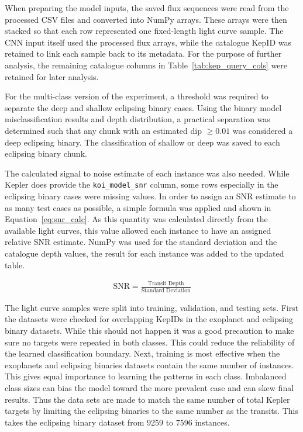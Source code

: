 When preparing the model inputs, the saved flux sequences were read from the processed CSV files and converted into NumPy arrays. These arrays were then stacked so that each row represented one fixed-length light curve sample. The CNN input itself used the processed flux arrays, while the catalogue KepID was retained to link each sample back to its metadata. For the purpose of further analysis, the remaining catalogue columns in Table~\ref{tab:kep_query_cols} were retained for later analysis. 

For the multi-class version of the experiment, a threshold was required to separate the deep and shallow eclipsing binary cases. Using the binary model misclassification results and depth distribution, a practical separation was determined such that any chunk with an estimated dip $\geq 0.01$ was considered a deep eclipsing binary. The classification of shallow or deep was saved to each eclipsing binary chunk.

The calculated signal to noise estimate of each instance was also needed. While Kepler does provide the \texttt{koi\_model\_snr} column, some rows especially in the eclipsing binary cases were missing values. In order to assign an SNR estimate to as many test cases as possible, a simple formula was applied and shown in Equation~\ref{eq:snr_calc}. As this quantity was calculated directly from the available light curves, this value allowed each instance to have an assigned relative SNR estimate. NumPy was used for the standard deviation and the catalogue depth values, the result for each instance was added to the updated table. 

\begin{align}
    \text{SNR} = \frac{\text{Transit Depth}}{\text{Standard Deviation}} \label{eq:snr_calc}
\end{align}

The light curve samples were split into training, validation, and testing sets. First the datasets were checked for overlapping KepIDs in the exoplanet and eclipsing binary datasets. While this should not happen it was a good precaution to make sure no targets were repeated in both classes. This could reduce the reliability of the learned classification boundary. Next, training is most effective when the exoplanets and eclipsing binaries datasets contain the same number of instances. This gives equal importance to learning the patterns in each class. Imbalanced class sizes can bias the model toward the more prevalent case and can skew final results. Thus the data sets are made to match the same number of total Kepler targets by limiting the eclipsing binaries to the same number as the transits. This takes the eclipsing binary dataset from 9259 to 7596 instances. 

